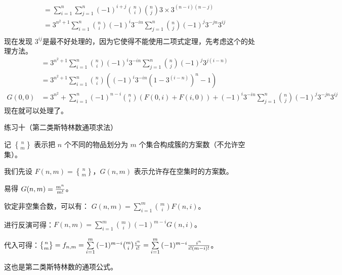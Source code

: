 \documentclass[UTF8]{beamer}
\begin{document}
    \begin{frame}
      \[
      \begin{aligned}
      &=\sum\limits_{i=1}^{n}\sum\limits_{j=1}^{n}(-1)^{i+j}{n \choose i}{n \choose j}3\times 3^{(n-i)(n-j)} \\
      &=3^{n^2+1}\sum\limits_{i=1}^{n}{n \choose i}(-1)^i3^{-in}\sum\limits_{j=1}^{n}{n \choose j}(-1)^j3^{-jn}3^{ij} \\
      \end{aligned}
      \] 
      现在发现 \(3^{ij}\)是最不好处理的，因为它使得不能使用二项式定理，先考虑这个的处理方法。 
      \[
      \begin{aligned}
      &=3^{n^2+1}\sum\limits_{i=1}^{n}{n \choose i}(-1)^i3^{-in}\sum\limits_{j=1}^{n}{n \choose j}(-1)^j3^{j(i-n)} \\
      &=3^{n^2+1}\sum\limits_{i=1}^{n}{n \choose i}((-1)^i3^{-in}(1-3^{(i-n)})^n-1) \\
      G(0,0)&=3^{n^2}+\sum\limits_{i=1}^{n}(-1)^{n-i}{n \choose i}(F(0,i)+F(i,0))+(-1)^i3^{-in}\sum\limits_{j=1}^{n}{n \choose j}(-1)^j3^{-jn}3^{ij}
      \end{aligned}
      \] 
      现在就可以处理了。
    \end{frame}
    
    \begin{frame}
      \begin{block}{{练习十（第二类斯特林数通项求法）}\label{ux7ec3ux4e60ux5341ux7b2cux4e8cux7c7bux65afux7279ux6797ux6570ux901aux9879ux6c42ux6cd5}}

      记 \({n\brace m}\) 表示把 \(n\) 个不同的物品划分为 \(m\)
      个集合构成簇的方案数（不允许空集）。
      \pause
      
      我们先设 \(F(n,m)={n \brace m}\)，\(G(n,m)\)
      表示允许存在空集时的方案数。
      
      \pause
      易得 \(G(n,m)={m^n \over m!}\)。
      
      \pause
      钦定非空集合数，可以有：
      \(G(n,m)=\sum\limits_{i=1}^{m}{m \choose i}F(n,i)。\)
      
      \pause
      进行反演可得：\(F(n,m)=\sum\limits_{i=1}^{m}{m \choose i}(-1)^{m-i}G(n,i)。\)
      
      \pause
      代入可得：\({n\brace m} = f_{n,m}=\sum\limits_{i=1}^m{(-1)^{m-i}\binom mi {i^n \over i!}}=\sum\limits_{i=1}^m{(-1)^{m-i}{i^n \over i!(m-i)!}}\)。
      
      这也是第二类斯特林数的通项公式。
      \end{block}
    \end{frame}
\end{document}
